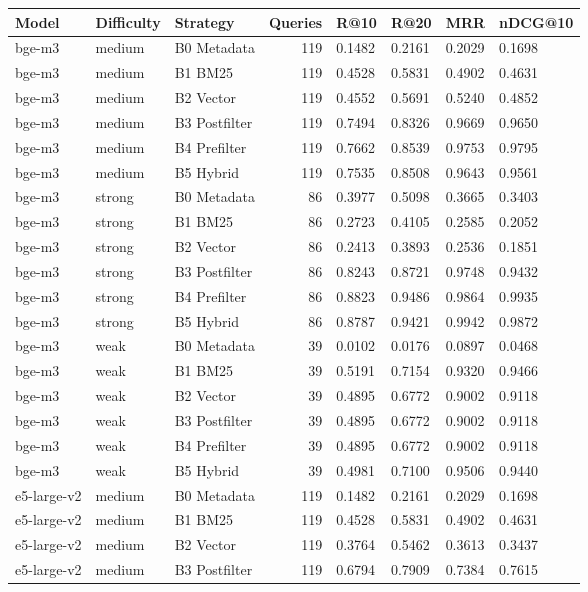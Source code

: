 \begin{tabular}{lllrllll}
\toprule
Model & Difficulty & Strategy & Queries & R@10 & R@20 & MRR & nDCG@10 \\
\midrule
bge-m3 & medium & B0 Metadata & 119 & 0.1482 & 0.2161 & 0.2029 & 0.1698 \\
bge-m3 & medium & B1 BM25 & 119 & 0.4528 & 0.5831 & 0.4902 & 0.4631 \\
bge-m3 & medium & B2 Vector & 119 & 0.4552 & 0.5691 & 0.5240 & 0.4852 \\
bge-m3 & medium & B3 Postfilter & 119 & 0.7494 & 0.8326 & 0.9669 & 0.9650 \\
bge-m3 & medium & B4 Prefilter & 119 & 0.7662 & 0.8539 & 0.9753 & 0.9795 \\
bge-m3 & medium & B5 Hybrid & 119 & 0.7535 & 0.8508 & 0.9643 & 0.9561 \\
bge-m3 & strong & B0 Metadata & 86 & 0.3977 & 0.5098 & 0.3665 & 0.3403 \\
bge-m3 & strong & B1 BM25 & 86 & 0.2723 & 0.4105 & 0.2585 & 0.2052 \\
bge-m3 & strong & B2 Vector & 86 & 0.2413 & 0.3893 & 0.2536 & 0.1851 \\
bge-m3 & strong & B3 Postfilter & 86 & 0.8243 & 0.8721 & 0.9748 & 0.9432 \\
bge-m3 & strong & B4 Prefilter & 86 & 0.8823 & 0.9486 & 0.9864 & 0.9935 \\
bge-m3 & strong & B5 Hybrid & 86 & 0.8787 & 0.9421 & 0.9942 & 0.9872 \\
bge-m3 & weak & B0 Metadata & 39 & 0.0102 & 0.0176 & 0.0897 & 0.0468 \\
bge-m3 & weak & B1 BM25 & 39 & 0.5191 & 0.7154 & 0.9320 & 0.9466 \\
bge-m3 & weak & B2 Vector & 39 & 0.4895 & 0.6772 & 0.9002 & 0.9118 \\
bge-m3 & weak & B3 Postfilter & 39 & 0.4895 & 0.6772 & 0.9002 & 0.9118 \\
bge-m3 & weak & B4 Prefilter & 39 & 0.4895 & 0.6772 & 0.9002 & 0.9118 \\
bge-m3 & weak & B5 Hybrid & 39 & 0.4981 & 0.7100 & 0.9506 & 0.9440 \\
e5-large-v2 & medium & B0 Metadata & 119 & 0.1482 & 0.2161 & 0.2029 & 0.1698 \\
e5-large-v2 & medium & B1 BM25 & 119 & 0.4528 & 0.5831 & 0.4902 & 0.4631 \\
e5-large-v2 & medium & B2 Vector & 119 & 0.3764 & 0.5462 & 0.3613 & 0.3437 \\
e5-large-v2 & medium & B3 Postfilter & 119 & 0.6794 & 0.7909 & 0.7384 & 0.7615 \\

\end{tabular}
